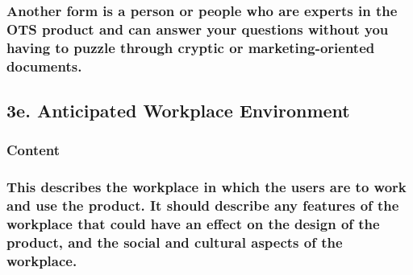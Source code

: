 \documentclass[
]{article}
\begin{document}
\hypertarget{another-form-is-a-person-or-people-who-are-experts-in-the-ots-product-and-can-answer-your-questions-without-you-having-to-puzzle-through-cryptic-or-marketing-oriented-documents.}{%
\subsubsection{Another form is a person or people who are experts in the
OTS product and can answer your questions without you having to puzzle
through cryptic or marketing-oriented
documents.}\label{another-form-is-a-person-or-people-who-are-experts-in-the-ots-product-and-can-answer-your-questions-without-you-having-to-puzzle-through-cryptic-or-marketing-oriented-documents.}}

\hypertarget{e.-anticipated-workplace-environment}{%
\subsection{3e. Anticipated Workplace
Environment}\label{e.-anticipated-workplace-environment}}

\hypertarget{content-14}{%
\subsubsection{Content}\label{content-14}}

\hypertarget{this-describes-the-workplace-in-which-the-users-are-to-work-and-use-the-product.-it-should-describe-any-features-of-the-workplace-that-could-have-an-effect-on-the-design-of-the-product-and-the-social-and-cultural-aspects-of-the-workplace.}{%
\subsubsection{\texorpdfstring{This describes the workplace in which the
users are to work and use the product. It should describe any features
of the workplace that could have an effect on the design of the product,
and the social and cultural aspects of the workplace.
}{This describes the workplace in which the users are to work and use the product. It should describe any features of the workplace that could have an effect on the design of the product, and the social and cultural aspects of the workplace. }}\label{this-describes-the-workplace-in-which-the-users-are-to-work-and-use-the-product.-it-should-describe-any-features-of-the-workplace-that-could-have-an-effect-on-the-design-of-the-product-and-the-social-and-cultural-aspects-of-the-workplace.}}
\end{document}
